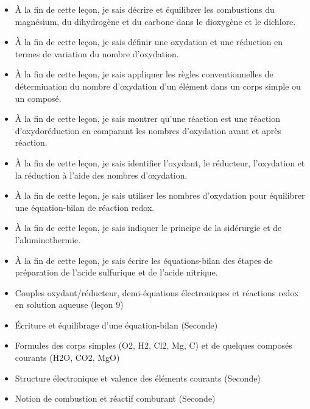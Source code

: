 \documentclass[11pt]{article}
\begin{document}
\begin{objectifs}
\begin{itemize}
\item À la fin de cette leçon, je sais décrire et équilibrer les combustions du magnésium, du dihydrogène et du carbone dans le dioxygène et le dichlore.
\item À la fin de cette leçon, je sais définir une oxydation et une réduction en termes de variation du nombre d'oxydation.
\item À la fin de cette leçon, je sais appliquer les règles conventionnelles de détermination du nombre d'oxydation d'un élément dans un corps simple ou un composé.
\item À la fin de cette leçon, je sais montrer qu'une réaction est une réaction d'oxydoréduction en comparant les nombres d'oxydation avant et après réaction.
\item À la fin de cette leçon, je sais identifier l'oxydant, le réducteur, l'oxydation et la réduction à l'aide des nombres d'oxydation.
\item À la fin de cette leçon, je sais utiliser les nombres d'oxydation pour équilibrer une équation-bilan de réaction redox.
\item À la fin de cette leçon, je sais indiquer le principe de la sidérurgie et de l'aluminothermie.
\item À la fin de cette leçon, je sais écrire les équations-bilan des étapes de préparation de l'acide sulfurique et de l'acide nitrique.
\end{itemize}
\end{objectifs}

\begin{prerequis}
\begin{itemize}
\item Couples oxydant/réducteur, demi-équations électroniques et réactions redox en solution aqueuse (leçon 9)
\item Écriture et équilibrage d'une équation-bilan (Seconde)
\item Formules des corps simples (O2, H2, Cl2, Mg, C) et de quelques composés courants (H2O, CO2, MgO)
\item Structure électronique et valence des éléments courants (Seconde)
\item Notion de combustion et réactif comburant (Seconde)
\end{itemize}
\end{prerequis}

\newpage
\end{document}
